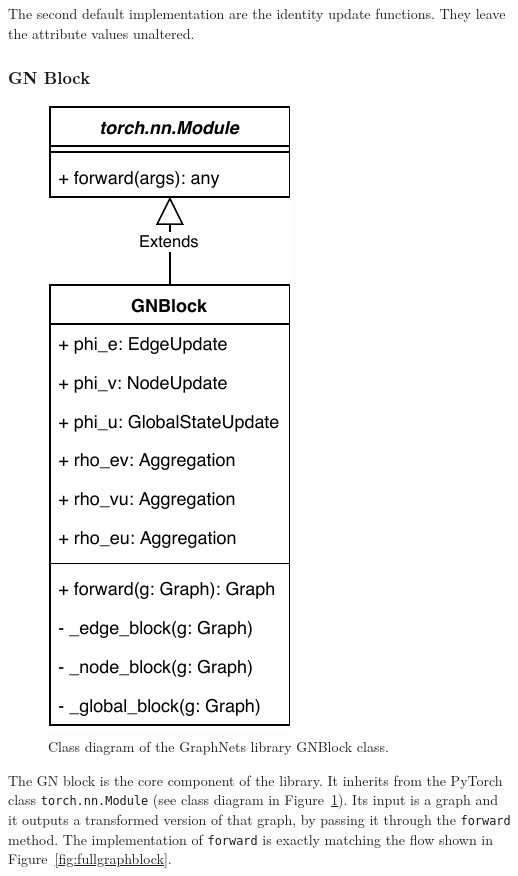 The second default implementation are the identity update functions. They leave the attribute values unaltered.

\subsubsection{GN Block}

\begin{figure}\centering
    \includegraphics[scale=0.65]{resources/graphnets-block}
    \caption[Class diagram of the GraphNets library GNBlock class]{Class diagram of the GraphNets library GNBlock class.}\label{fig:classdiagramgnblock}
\end{figure}

The GN block is the core component of the library. It inherits from the PyTorch class \texttt{torch.nn.Module} (see class diagram in Figure~\ref{fig:classdiagramgnblock}). Its input is a graph and it outputs a transformed version of that graph, by passing it through the \texttt{forward} method. The implementation of \texttt{forward} is exactly matching the flow shown in Figure~\ref{fig:fullgraphblock}.

